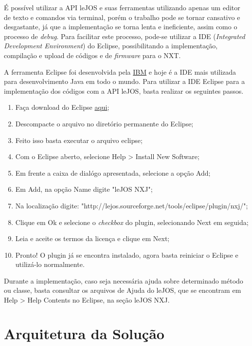 	É possível utilizar a API leJOS e suas ferramentas utilizando apenas um editor de texto e comandos via terminal, porém o trabalho pode se tornar cansativo e
	desgastante, já que a implementação se torna lenta e ineficiente, assim como o processo de \textit{debug}. Para facilitar este processo, pode-se utilizar
	a IDE (\textit{Integrated Development Environment}) do Eclipse, possibilitando a implementação, compilação e upload de códigos e de \textit{firmware} para o NXT.

	A ferramenta Eclipse foi desenvolvida pela \href{https://www.ibm.com/br-pt/}{IBM} e hoje é a IDE mais utilizada para desenvolvimento Java em todo o mundo.
	Para utilizar a IDE Eclipse para a implementação dos códigos com a API leJOS, basta realizar os seguintes passos.

	\begin{enumerate}
		\item Faça download do Eclipse \href{www.eclipse.org}{aqui};
		\item Descompacte o arquivo no diretório permanente do Eclipse;
		\item Feito isso basta executar o arquivo eclipse;
		\item Com o Eclipse aberto, selecione Help > Install New Software;
		\item Em frente a caixa de dialógo apresentada, selecione a opção Add;
		\item Em Add, na opção Name digite "leJOS NXJ";
		\item Na localização digite: "http://lejos.sourceforge.net/tools/eclipse/plugin/nxj/";
		\item Clique em Ok e selecione o \textit{checkbox} do plugin, selecionando Next em seguida;
		\item Leia e aceite os termos da licença e clique em Next;
		\item Pronto! O plugin já se encontra instalado, agora basta reiniciar o Eclipse e utilizá-lo normalmente.
	\end{enumerate}

	Durante a implementação, caso seja necessária ajuda sobre determinado método ou classe, basta consultar os arquivos de Ajuda do leJOS, que se encontram em
	Help > Help Contents no Eclipse, na seção leJOS NXJ.

\section{Arquitetura da Solução}

